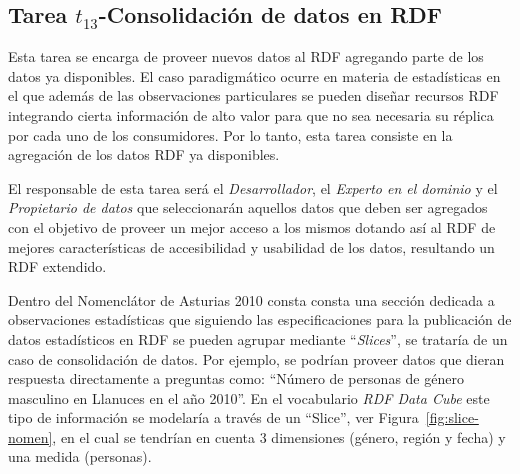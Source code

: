 \subsection{Tarea $t_{13}$-Consolidación de datos en RDF}
Esta tarea se encarga de proveer nuevos datos al \dataset RDF agregando parte de los datos ya disponibles. El caso
paradigmático ocurre en materia de estadísticas en el que además de las observaciones particulares se pueden
diseñar recursos \gls{RDF} integrando cierta información de alto valor para que no sea necesaria su réplica por 
cada uno de los consumidores. Por lo tanto, esta tarea consiste en la agregación de los datos RDF ya disponibles.

El responsable de esta tarea será el \textit{Desarrollador}, el \textit{Experto en el dominio} y el \textit{Propietario de datos} que seleccionarán
aquellos datos que deben ser agregados con el objetivo de proveer un mejor acceso a los mismos dotando así al \dataset
RDF de mejores características de accesibilidad y usabilidad de los datos, resultando un \dataset RDF extendido.

Dentro del Nomenclátor de Asturias 2010 consta consta una sección dedicada a observaciones estadísticas que siguiendo las especificaciones
para la publicación de datos estadísticos en RDF se pueden agrupar mediante ``\textit{Slices}'', se trataría de un caso de consolidación
de datos. Por ejemplo, se podrían proveer datos que dieran respuesta directamente a preguntas como: ``Número de personas de género masculino en Llanuces en el año 2010''.
En el vocabulario \textit{RDF Data Cube} este tipo de información se modelaría a través de un ``Slice'', ver Figura~\ref{fig:slice-nomen},
 en el cual se tendrían en cuenta 3 dimensiones (género, región y fecha) y una medida (personas).

